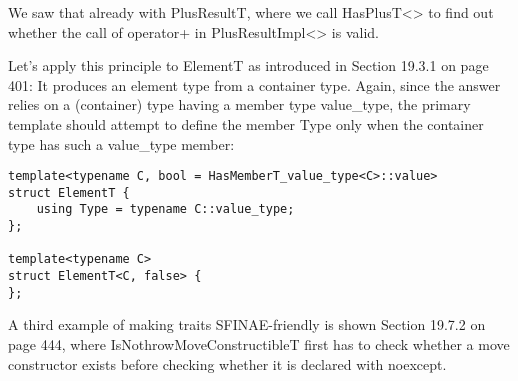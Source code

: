We saw that already with PlusResultT, where we call HasPlusT<> to find out whether the call of operator+ in PlusResultImpl<> is valid.

Let’s apply this principle to ElementT as introduced in Section 19.3.1 on page 401: It produces an element type from a container type. Again, since the answer relies on a (container) type having a member type value\_type, the primary template should attempt to define the member Type only when the container type has such a value\_type member:

\begin{lstlisting}[style=styleCXX]
template<typename C, bool = HasMemberT_value_type<C>::value>
struct ElementT {
	using Type = typename C::value_type;
};

template<typename C>
struct ElementT<C, false> {
};
\end{lstlisting}

A third example of making traits SFINAE-friendly is shown Section 19.7.2 on page 444, where IsNothrowMoveConstructibleT first has to check whether a move constructor exists before checking whether it is declared with noexcept.














